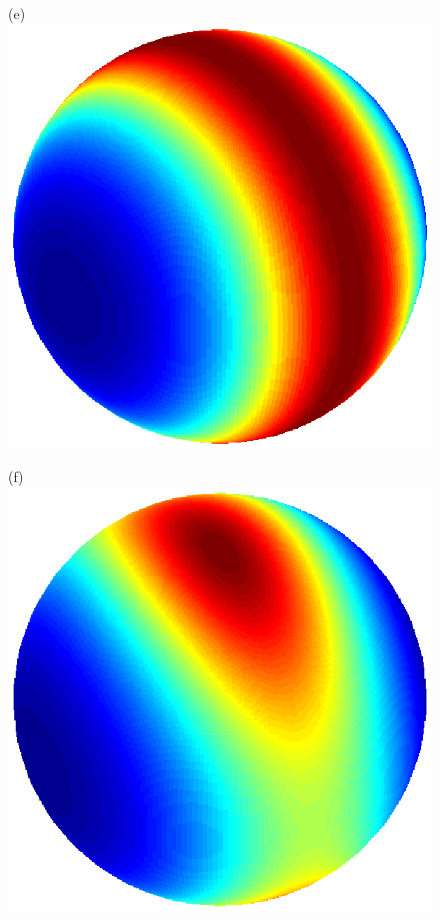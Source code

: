 \documentclass[dvips,aoas,preprint]{imsart}
\numberwithin{equation}{section}
\theoremstyle{plain}
\begin{document}
\begin{figure}[!htbp]
\begin{minipage}[]{0.10\textwidth}
  \end{minipage}
  \begin{minipage}[]{0.10\textwidth}
    \centering
    (e)
    \includegraphics*[width=\textwidth]{infreq1.ps}
  \end{minipage}
  \begin{minipage}[]{0.10\textwidth}
    \centering
    (f)
    \includegraphics*[width=\textwidth]{infreq2.ps}

\end{minipage}
\end{figure}
\end{document}
